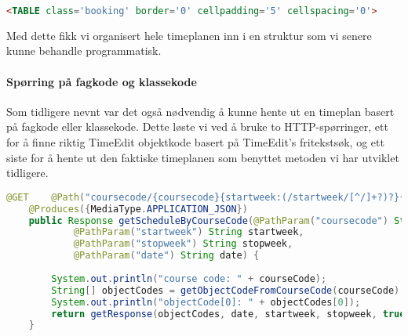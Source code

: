 \documentclass[../main.tex]{subfiles}
\begin{document}
\begin{lstlisting}[language=HTML, frame=single, caption={asdasdsadasdasdasdsadsadasdasdsadsa}]
<TABLE class='booking' border='0' cellpadding='5' cellspacing='0'>
\end{lstlisting}

Med dette fikk vi organisert hele timeplanen inn i en struktur som vi senere kunne behandle programmatisk.  

\paragraph{Spørring på fagkode og klassekode}

Som tidligere nevnt var det også nødvendig å kunne hente ut en timeplan basert på fagkode eller klassekode. Dette løste vi ved å bruke to HTTP-spørringer, ett for å finne riktig TimeEdit objektkode basert på TimeEdit’s fritekstsøk, og ett siste for å hente ut den faktiske timeplanen som benyttet metoden vi har utviklet tidligere.

\begin{lstlisting}[language=Java, frame=single, caption={asdasdsadasdasdasdsadsadasdasdsadsa}]
@GET    @Path("coursecode/{coursecode}{startweek:(/startweek/[^/]+?)?}{stopweek:(/stopweek/[^/]+?)?}{date:(/date/[^/]+?)?}")
    @Produces({MediaType.APPLICATION_JSON})
    public Response getScheduleByCourseCode(@PathParam("coursecode") String courseCode,
            @PathParam("startweek") String startweek,
            @PathParam("stopweek") String stopweek,
            @PathParam("date") String date) {
        
        System.out.println("course code: " + courseCode);
        String[] objectCodes = getObjectCodeFromCourseCode(courseCode).split("/");
        System.out.println("objectCode[0]: " + objectCodes[0]);
        return getResponse(objectCodes, date, startweek, stopweek, true);
    }
\end{lstlisting}
\end{document}
